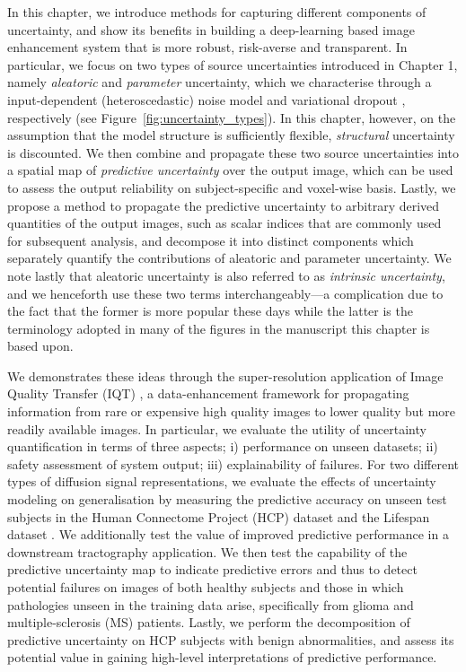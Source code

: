 In this chapter, we introduce methods for capturing different components of uncertainty, and show its benefits in building a deep-learning based image enhancement system that is more robust, risk-averse and transparent. In particular, we focus on two types of source uncertainties introduced in Chapter 1, namely \textit{aleatoric} and \textit{parameter} uncertainty, which we characterise through a input-dependent (heteroscedastic) noise model \cite{nix1994estimating} and variational dropout \cite{kingma2015variational}, respectively (see Figure~\ref{fig:uncertainty_types}). In this chapter, however, on the assumption that the model structure is sufficiently flexible, \textit{structural} uncertainty is discounted. We then combine and propagate these two source uncertainties into a spatial map of \textit{predictive uncertainty} over the output image, which can be used to assess the output reliability on subject-specific and voxel-wise basis. Lastly, we propose a method to propagate the predictive uncertainty to arbitrary derived quantities of the output images, such as scalar indices that are commonly used for subsequent analysis, and decompose it into distinct components which separately quantify the contributions of aleatoric and parameter uncertainty. We note lastly that aleatoric uncertainty is also referred to as \textit{intrinsic uncertainty}, and we henceforth use these two terms interchangeably---a complication due to the fact that the former is more popular these days while the latter is the terminology adopted in many of the figures in the manuscript this chapter is based upon.  

We demonstrates these ideas through the super-resolution application of Image Quality Transfer (IQT) \cite{alexander2014image,tanno2016bayesian,alexander2017image,blumberg2018deeper}, a data-enhancement framework for propagating information from rare or expensive high quality images to lower quality but more readily available images. In particular, we evaluate the utility of uncertainty quantification in terms of three aspects; i) performance on unseen datasets; ii) safety assessment of system output; iii) explainability of failures. For two different types of diffusion signal representations, we evaluate the effects of uncertainty modeling on generalisation by measuring the predictive accuracy on unseen test subjects in the Human Connectome Project (HCP) dataset \cite{sotiropoulos2013advances} and the Lifespan dataset \cite{harms2018extending}. We additionally test the value of improved predictive performance in a downstream tractography application. We then test the capability of the predictive uncertainty map to indicate predictive errors and thus to detect potential failures on images of both healthy subjects and those in which pathologies unseen in the training data arise, specifically from glioma and multiple-sclerosis (MS) patients. Lastly, we perform the decomposition of predictive uncertainty on HCP subjects with benign abnormalities, and assess its potential value in gaining high-level interpretations of predictive performance. 




